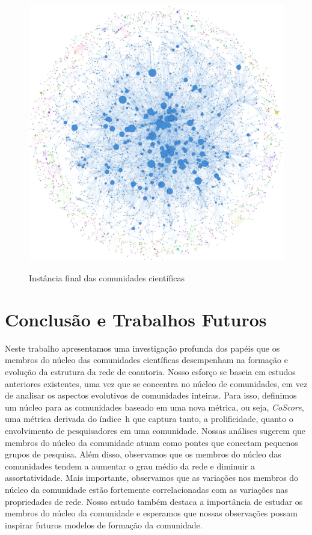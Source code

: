 \documentclass[12pt]{article}
\begin{document}
\begin{figure}[!htb]
\begin{center}
{    \includegraphics[scale=.21]{graficos/network/chi.eps}
  }%
  \end{center}
  \caption{Instância final das comunidades científicas}
  \label{fig:redes}
\end{figure}

\section{Conclusão e Trabalhos Futuros}

Neste trabalho apresentamos uma investigação profunda dos papéis que os membros do núcleo das 
comunidades científicas desempenham na formação e evolução da estrutura da rede de coautoria. Nosso esforço 
se baseia em estudos anteriores existentes, uma vez que se concentra no núcleo de comunidades, em vez de 
analisar os aspectos evolutivos de comunidades inteiras. Para isso, definimos um núcleo para as comunidades 
baseado em uma nova métrica, ou seja, \textit{CoScore}, uma métrica derivada do índice~h que captura 
tanto, a prolificidade, quanto o envolvimento de pesquisadores em uma comunidade. Nossas análises sugerem que membros 
do núcleo da comunidade atuam como pontes que conectam pequenos grupos de pesquisa. Além disso, observamos que 
os membros do núcleo das comunidades tendem a aumentar o grau médio da rede e diminuir a assortatividade. 
Mais importante, observamos que as variações nos membros do núcleo da comunidade estão fortemente correlacionadas 
com as variações nas propriedades de rede. Nosso estudo também destaca a importância de estudar os membros 
do núcleo da comunidade e esperamos que nossas observações possam inspirar futuros modelos de formação da comunidade.
\end{document}
